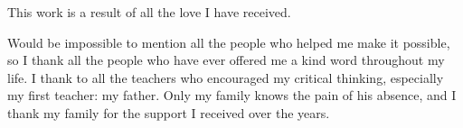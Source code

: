 \begin{agradecimentos}

This work is a result of all the love I have received.
\par
Would be impossible to mention all the people who helped me make it possible, so I thank all the people who have ever offered me a kind word throughout my life.
I thank to all the teachers who encouraged my critical thinking, especially my first teacher: my father. Only my family knows the pain of his absence, and I thank my family for the support I received over the years.

\end{agradecimentos}